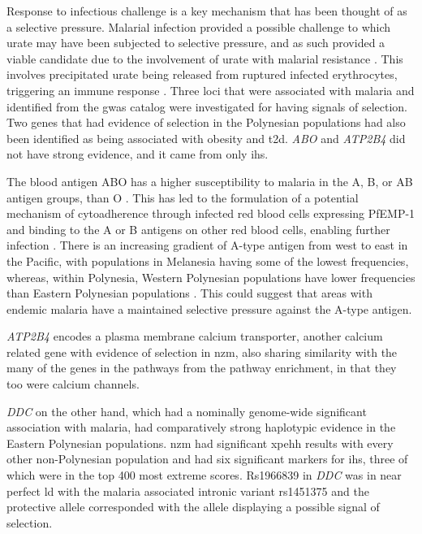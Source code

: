 \documentclass[]{report}
\begin{document}
Response to infectious challenge is a key mechanism that has been
thought of as a selective pressure. Malarial infection provided a
possible challenge to which urate may have been subjected to selective
pressure, and as such provided a viable candidate due to the involvement
of urate with malarial resistance \citep{GallegoDelgado2014}. This
involves precipitated urate being released from ruptured infected
erythrocytes, triggering an immune response
\citep{orengo_uric_2009, GallegoDelgado2014}. Three loci that were
associated with malaria and identified from the \gls{gwas} catalog were
investigated for having signals of selection. Two genes that had
evidence of selection in the Polynesian populations had also been
identified as being associated with obesity and \gls{t2d}. \emph{ABO}
and \emph{ATP2B4} did not have strong evidence, and it came from only
\gls{ihs}.

The blood antigen ABO has a higher susceptibility to malaria in the A,
B, or AB antigen groups, than O \citep{Zerihun2011}. This has led to the
formulation of a potential mechanism of cytoadherence through infected
red blood cells expressing PfEMP-1 and binding to the A or B antigens on
other red blood cells, enabling further infection \citep{Cserti2015}.
There is an increasing gradient of A-type antigen from west to east in
the Pacific, with populations in Melanesia having some of the lowest
frequencies, whereas, within Polynesia, Western Polynesian populations
have lower frequencies than Eastern Polynesian populations
\citep{Simmons1962}. This could suggest that areas with endemic malaria
have a maintained selective pressure against the A-type antigen.

\emph{ATP2B4} encodes a plasma membrane calcium transporter, another
calcium related gene with evidence of selection in \gls{nzm}, also
sharing similarity with the many of the genes in the pathways from the
pathway enrichment, in that they too were calcium channels.

\emph{DDC} on the other hand, which had a nominally genome-wide
significant association with malaria, had comparatively strong
haplotypic evidence in the Eastern Polynesian populations. \Gls{nzm} had
significant \gls{xpehh} results with every other non-Polynesian
population and had six significant markers for \gls{ihs}, three of which
were in the top 400 most extreme scores. Rs1966839 in \emph{DDC} was in
near perfect \gls{ld} with the malaria associated intronic variant
rs1451375 \citep{jallow2009genome} and the protective allele
corresponded with the allele displaying a possible signal of selection.
\end{document}
